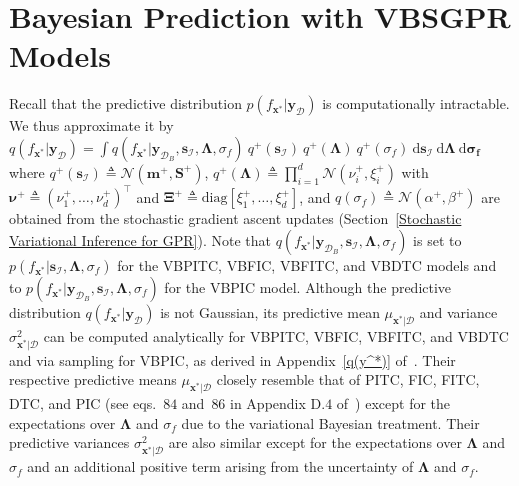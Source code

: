 \documentclass[conference]{IEEEtran}
\begin{document}
\section{Bayesian Prediction with VBSGPR Models}
\label{predict}
Recall that the predictive distribution $p(f_{\mathbf{x}^*}|\mathbf{y}_\mathcal{D})$ is computationally intractable. We thus approximate it by $q(f_{\mathbf{x}^*}|\mathbf{y}_\mathcal{D})=\int q(f_{\mathbf{x}^*}|\mathbf{y}_{\mathcal{D}_B},\mathbf{s}_\mathcal{I},\mathbf{\Lambda},\sigma_f)\ q^+(\mathbf{s}_\mathcal{I})\ q^+(\mathbf{\Lambda})\ q^+(\sigma_f)\ \mathrm{d}\mathbf{s}_\mathcal{I}\ \mathrm{d}\mathbf{\Lambda}\ \mathrm{d}\mathbf{\sigma_f}$ where $q^+(\mathbf{s}_\mathcal{I})\triangleq\mathcal{N}(\mathbf{m}^+,\mathbf{S}^+)$,  $q^+(\mathbf{\Lambda})\triangleq\prod_{i=1}^{d}\mathcal{N}(\nu_i^+,\xi_i^+)$ with $\boldsymbol{\nu}^+ \triangleq (\nu_1^+,\ldots,\nu_d^+)^\top$ and $\mathbf{\Xi}^+ \triangleq \mathrm{diag}[\xi_1^+,\ldots,\xi_d^+]$, and $q(\sigma_f)\triangleq\mathcal{N}(\alpha^+,\beta^+)$ are obtained from the stochastic gradient ascent updates (Section~\ref{Stochastic Variational Inference for GPR}). Note that $q(f_{\mathbf{x}^*}|\mathbf{y}_{\mathcal{D}_B}, \mathbf{s}_\mathcal{I},\mathbf{\Lambda},\sigma_f)$ is set to $p(f_{\mathbf{x}^*}|\mathbf{s}_\mathcal{I},\mathbf{\Lambda},\sigma_f)$ for the VBPITC, VBFIC, VBFITC, and VBDTC models and to  $p(f_{\mathbf{x}^*}|\mathbf{y}_{\mathcal{D}_B}, \mathbf{s}_\mathcal{I},\mathbf{\Lambda},\sigma_f)$ for the VBPIC model. Although the predictive distribution $q(f_{\mathbf{x}^*}|\mathbf{y}_\mathcal{D})$ is not Gaussian, its predictive mean $\mu_{\mathbf{x}^*|\mathcal{D}}$ and variance $\sigma^2_{\mathbf{x}^*|\mathcal{D}}$ can be computed analytically for VBPITC, VBFIC, VBFITC, and VBDTC and via sampling for VBPIC, as derived in Appendix~\ref{q(y^*)} of~\cite{HaibinAPP}.
Their respective predictive means $\mu_{\mathbf{x}^*|\mathcal{D}}$ closely resemble that of PITC, FIC, FITC, DTC, and PIC (see eqs.~$84$ and~$86$ in Appendix D.$4$ of~\cite{NghiaICML15}) except for the expectations over $\mathbf{\Lambda}$ and $\sigma_f$ due to the variational Bayesian treatment. Their predictive variances $\sigma^2_{\mathbf{x}^*|\mathcal{D}}$ are also similar except for the expectations over $\mathbf{\Lambda}$ and $\sigma_f$ and an additional positive term arising from the uncertainty of $\mathbf{\Lambda}$ and $\sigma_f$.
%	
\end{document}
